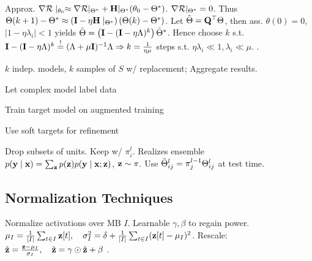 \begin{colored}
    Approx. \(\nabla \mathcal{R} \mid_{\theta_0} \approx \nabla \mathcal{R} |_{\Theta^*} + \vb{H}|_{\Theta^*}(\theta_0 - \Theta^*)\). \(\nabla \mathcal{R} |_{\Theta^*} = 0\). Thus \(\Theta(k+1) - \Theta^* \approx \left(\vb{I} - \eta \vb{H}\mid_{\Theta^*}\right)(\Theta(k) - \Theta^*)\). Let \(\tilde{\Theta} = \vb{Q}^\top \Theta\), then ass. \(\theta(0) = 0\), \(|1 - \eta \lambda_i| < 1\) yields \(\tilde{\Theta} = \left(\vb{I} - (\vb{I} - \eta \Lambda)^k\right) \tilde{\Theta}^*\). Hence choose \(k\) s.t. \(\vb{I} - (\vb{I} - \eta \Lambda)^k \overset{!}{=} (\Lambda + \mu\vb{I})^{-1}\Lambda \Rightarrow k = \frac{1}{\eta\mu}\) steps s.t. \(\eta \lambda_i \ll 1, \lambda_i \ll \mu\). .
\end{colored}

\begin{definition}[Bagging]
    \(k\) indep. models, \(k\) samples of \(S\) w/ replacement; Aggregate results.
\end{definition}

\begin{definition}[Distillation]
    \begin{enumerate*}
        \item Let complex model label data
        \item Train target model on augmented training
        \item Use soft targets for refinement
    \end{enumerate*}
\end{definition}

\begin{definition}[Dropout]
    Drop subsets of units. Keep w/ \(\pi_i^l\). Realizes ensemble \(p(\vb{y} \mid \vb{x}) = \sum_{\vb{z}} p(\vb{z}) p(\vb{y} \mid \vb{x}; \vb{z})\), \(\vb{z} \sim \pi\). Use \(\tilde{\Theta}_{ij}^l = \pi_j^{l-1}\Theta_{ij}^l\) at test time.
\end{definition}

\subsection{Normalization Techniques}
\begin{definition}
    Normalize activations over MB \(I\). Learnable \(\gamma, \beta\) to regain power.
    \(\mu_I = \frac{1}{|I|}\sum_{t \in I} \vb{z}[t], \quad \sigma_I^2 = \delta + \frac{1}{|I|}\sum_{t \in I} (\vb{z}[t] - \mu_I)^2\). Rescale: 
    \(\hat{\vb{z}} = \frac{\vb{z} - \mu_I}{\sigma_I}, \quad \tilde{\vb{z}} = \gamma \odot \hat{\vb{z}} + \beta\)
    .
\end{definition}

